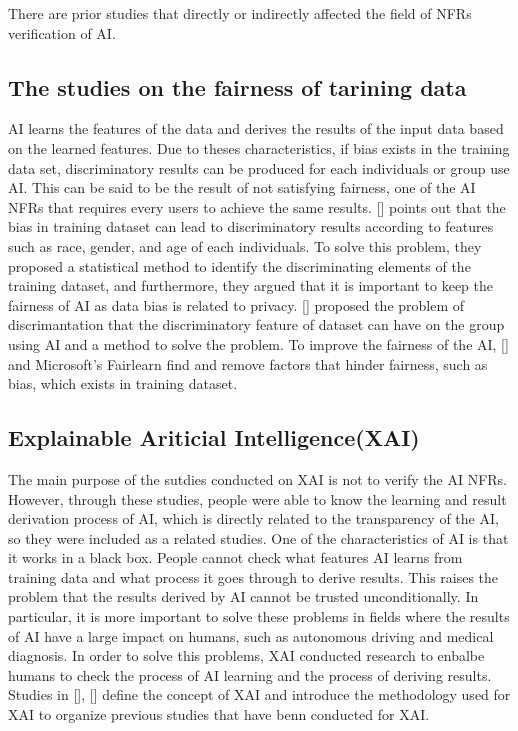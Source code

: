 \documentclass[journal,article,submit,moreauthors,pdftex]{Definitions/mdpi}
\begin{document}
There are prior studies that directly or indirectly affected the field of NFRs verification of AI.

\subsection{The studies on the fairness of tarining data}

AI learns the features of the data and derives the results of the input data based on the learned features. Due to theses characteristics, if bias exists in the training data set, discriminatory results can be produced for each individuals or group use AI.
This can be said to be the result of not satisfying fairness, one of the AI NFRs that requires every users to achieve the same results.
[] points out that the bias in training dataset can lead to discriminatory results according to features such as race, gender, and age of each individuals.
To solve this problem, they proposed a statistical method to identify the discriminating elements of the training dataset, and furthermore, they argued that it is important to keep the fairness of AI as data bias is related to privacy.
[] proposed the problem of discrimantation that the discriminatory feature of dataset can have on the group using AI and a method to solve the problem.
To improve the fairness of the AI, [] and Microsoft's Fairlearn find and remove factors that hinder fairness, such as bias, which exists in training dataset.

\subsection{Explainable Ariticial Intelligence(XAI)}

The main purpose of the sutdies conducted on XAI is not to verify the AI NFRs.
However, through these studies, people were able to know the learning and result derivation process of AI, which is directly related to the transparency of the AI, so they were included as a related studies.
One of the characteristics of AI is that it works in a black box. People cannot check what features AI learns from training data and what process it goes through to derive results.
This raises the problem that the results derived by AI cannot be trusted unconditionally.
In particular, it is more important to solve these problems in fields where the results of AI have a large impact on humans, such as autonomous driving and medical diagnosis.
In order to solve this problems, XAI conducted research to enbalbe humans to check the process of AI learning and the process of deriving results.
Studies in [], [] define the concept of XAI and introduce the methodology used for XAI to organize previous studies that have benn conducted for XAI.
\end{document}
